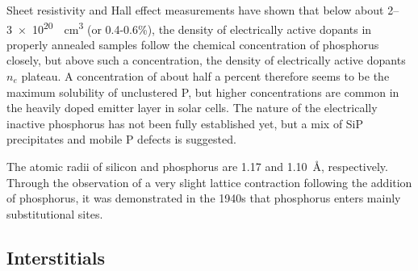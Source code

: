 \documentclass[11pt,bibliography=totoc,index=totoc]{scrbook}   %
\newcommand{\comment}[1]{\hl{#1}}
\begin{document}
Sheet resistivity and Hall effect measurements have shown that below about 2–\SI{3e20}{\per\centi\metre\cubed} (or 0.4-0.6\%), the density of electrically active dopants in properly annealed samples follow the chemical concentration of phosphorus closely, but above such a concentration, the density of electrically active dopants $n_e$ plateau.\cite{Tannenbaum:1961}
A concentration of about half a percent therefore seems to be the maximum solubility of unclustered P,\cite{Solmi:1998} but higher concentrations
are common in the heavily doped emitter layer in solar cells.\cite{Bentzen:2006b}
The nature of the electrically inactive phosphorus has not been fully established yet, but a mix of SiP precipitates and mobile P defects is suggested.\cite{Armigliato:1976}\cite{Solmi:1996} 


The atomic radii of silicon and phosphorus are 1.17 and 1.10~Å, respectively.
Through the observation of a very slight lattice contraction following the addition of phosphorus,
it was demonstrated in the 1940s that phosphorus enters mainly substitutional sites.\cite{Pearson:1949}




%
\subsection{Interstitials}\label{sec:PInterstitials}
%
\end{document}
